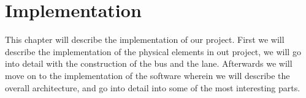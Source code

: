 \chapter{Implementation}
This chapter will describe the implementation of our project. First we will describe the implementation of the physical elements in out project, we will go into detail with the construction of the bus and the lane.
Afterwards we will move on to the implementation of the software wherein we will describe the overall architecture, and go into detail into some of the most interesting parts.








